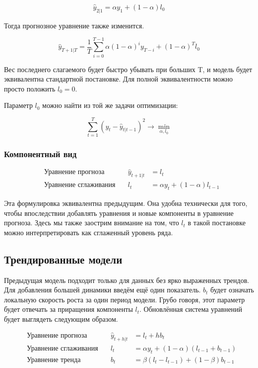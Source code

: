\documentclass[12pt,fleqn]{article}
\begin{document}
$$
 \hat{y}_{2|1} = \alpha y_1 +(1-\alpha) l_0
$$

Тогда прогнозное уравнение также изменится.

$$
\hat{y}_{T+1|T} = \frac{1}{T}\sum_{i=0}^{T-1} \alpha (1-\alpha)^{i} y_{T-i} + (1-\alpha)^T l_0
$$

Вес последнего слагаемого будет быстро убывать при больших T, и модель будет эквивалентна стандартной постановке. Для полной эквивалентности можно просто положить $l_0 = 0$.

Параметр $l_0$ можно найти из той же задачи оптимизации:

$$
\sum_{t=1}^{T}(y_t - \hat{y}_{t|t-1})^2 \rightarrow \min_{\alpha, l_0}
$$


\subsubsection{Компонентный вид}

\begin{equation}
	\begin{split}
		&\text{Уравнение прогноза} \quad & 	\hat{y}_{t+1|t}& = l_t \\
		&\text{Уравнение сглаживания}\quad & l_t& =\alpha y_t +(1-\alpha) l_{t-1}
	\end{split}
\end{equation}

Эта формулировка эквивалентна предыдущим. Она удобна технически для того, чтобы впоследствии добавлять уравнения и новые компоненты в уравнение прогноза. Здесь мы также заострим внимание на том, что $l_t$ в такой постановке можно интерпретировать как сглаженный уровень ряда.



\subsection{Трендированные модели}

Предыдущая модель подходит только для данных без ярко выраженных трендов.
Для добавления большей динамики введём ещё один показатель.
$b_t$ будет означать локальную скорость роста за один период модели.
Грубо говоря, этот параметр будет отвечать за приращения компоненты $l_t$. Обновлённая система уравнений будет выглядеть следующим образом.

\begin{equation}
	\begin{split}
		&\text{Уравнение прогноза} \quad & 	\hat{y}_{t+h|t}& = l_t + h b_t \\
		&\text{Уравнение сглаживания}\quad & l_t& =\alpha y_t +(1-\alpha)(l_{t-1} + b_{t-1}) \\
		&\text{Уравнение тренда}\quad & b_t& =\beta (l_t - l_{t-1}) +(1-\beta) b_{t-1}
	\end{split}
\end{equation}
\end{document}

